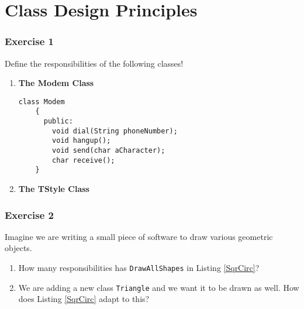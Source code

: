 \documentclass[14pt,a4paper]{article}
\begin{document}
\part*{Class Design Principles}
\label{part:all}

 
\section*{Exercise 1}
\large
Define the responsibilities of the following classes!\\
 \begin{enumerate}
\item \large \textbf{The Modem Class}\\
  \small
  \begin{lstlisting}[float=ht,caption={\large \textbf{The Modem Class}}]
    class Modem
    {
      public:
        void dial(String phoneNumber);
        void hangup();
        void send(char aCharacter);
        char receive();
    }
  \end{lstlisting}
  
\newpage
\item \large \textbf{The TStyle Class}\\
  \small 
  \normalsize
\end{enumerate}

\newpage
\section*{Exercise 2}
Imagine we are writing a small piece of software to draw various geometric objects.\\
\small
 
\normalsize
\begin{enumerate}
\item How many responsibilities has \texttt{DrawAllShapes} in Listing \ref{SqrCirc}?
\item We are adding a new class \texttt{Triangle} and we want it to be drawn as well. How does Listing \ref{SqrCirc} adapt to this?
\end{enumerate}
\end{document}

